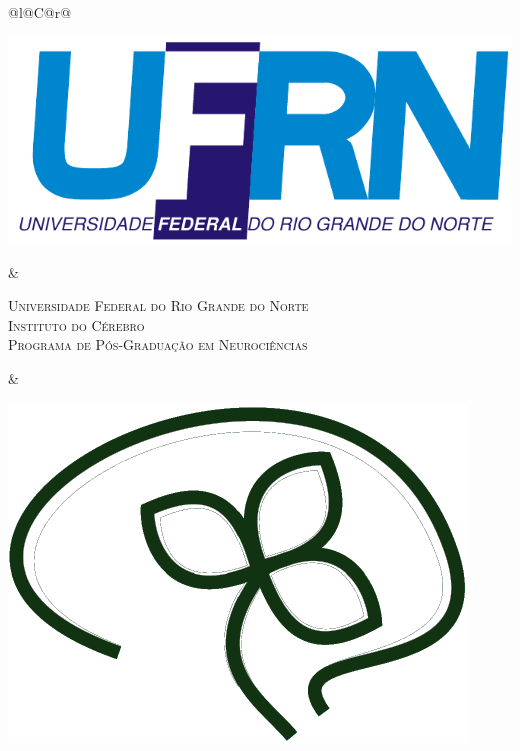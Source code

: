 %
%

\begin{titlepage}

\begin{center}

\small

\begin{tabularx}{\linewidth}{@{}l@{}C@{}r@{}}
	\parbox[c]{3cm}{\includegraphics[width=\linewidth]{tex/00-estrutural/figuras/UFRN}} &
	
	\begin{center}
		\textsf{\textsc{Universidade Federal do Rio Grande do Norte\\
			Instituto do Cérebro\\
			Programa de Pós-Graduação em Neurociências}}
	\end{center} &
	
	\parbox[c]{3cm}{\includegraphics[width=\linewidth]{tex/00-estrutural/figuras/Ice}}
\end{tabularx}


\end{center}
\end{titlepage}
